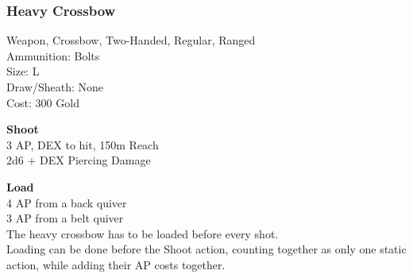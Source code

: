\subsubsection{Heavy Crossbow}\label{weapon:heavyCrossbow}
Weapon, Crossbow, Two-Handed, Regular, Ranged\\
Ammunition: Bolts\\
Size: L\\
Draw/Sheath: None\\
Cost: 300 Gold

\textbf{Shoot} \\
3 AP, DEX to hit, 150m Reach\\
2d6 + \texttimes DEX Piercing Damage

\textbf{Load} \\
4 AP from a back quiver\\
3 AP from a belt quiver\\
The heavy crossbow has to be loaded before every shot.\\
Loading can be done before the Shoot action, counting together as only one static action, while adding their AP costs together.

